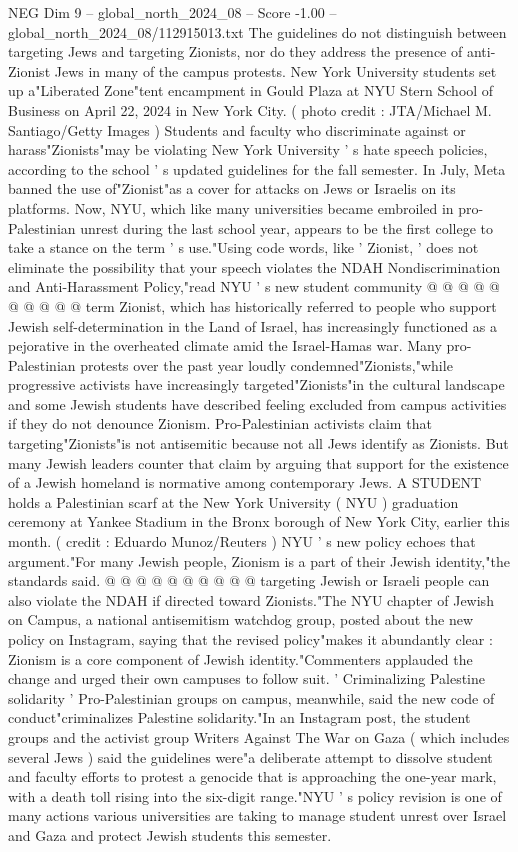\begin{textsample}{NEG Dim 9 – global\_north\_2024\_08 – Score -1.00 – global\_north\_2024\_08/112915013.txt}  \label{ex:f9_neg_263}
The guidelines do not distinguish between targeting Jews and targeting Zionists, nor do they address the presence of anti-Zionist Jews in many of the campus protests.
New York University students set up a"Liberated Zone"tent encampment in Gould Plaza at NYU Stern School of Business on April 22, 2024 in New York City. ( photo credit : JTA/Michael M.
Santiago/Getty Images ) Students and faculty who discriminate against or harass"Zionists"may be violating New York University ' s hate speech policies, according to the school ' s updated guidelines for the fall semester.
In July, Meta banned the use of"Zionist"as a cover for attacks on Jews or Israelis on its platforms.
Now, NYU, which like many universities became embroiled in pro-Palestinian unrest during the last school year, appears to be the first college to take a stance on the term ' s use."Using code words, like ' Zionist, ' does not eliminate the possibility that your speech violates the NDAH Nondiscrimination and Anti-Harassment Policy,"read NYU ' s new student community @ @ @ @ @ @ @ @ @ @ term Zionist, which has historically referred to people who support Jewish self-determination in the Land of Israel, has increasingly functioned as a pejorative in the overheated climate amid the Israel-Hamas war.
Many pro-Palestinian protests over the past year loudly condemned"Zionists,"while progressive activists have increasingly targeted"Zionists"in the cultural landscape and some Jewish students have described feeling excluded from campus activities if they do not denounce Zionism.
Pro-Palestinian activists claim that targeting"Zionists"is not antisemitic because not all Jews identify as Zionists.
But many Jewish leaders counter that claim by arguing that support for the existence of a Jewish homeland is normative among contemporary Jews.
A STUDENT holds a Palestinian scarf at the New York University ( NYU ) graduation ceremony at Yankee Stadium in the Bronx borough of New York City, earlier this month. ( credit : Eduardo Munoz/Reuters ) NYU ' s new policy echoes that argument."For many Jewish people, Zionism is a part of their Jewish identity,"the standards said. @ @ @ @ @ @ @ @ @ @ targeting Jewish or Israeli people can also violate the NDAH if directed toward Zionists."The NYU chapter of Jewish on Campus, a national antisemitism watchdog group, posted about the new policy on Instagram, saying that the revised policy"makes it abundantly clear : Zionism is a core component of Jewish identity."Commenters applauded the change and urged their own campuses to follow suit. ' Criminalizing Palestine solidarity ' Pro-Palestinian groups on campus, meanwhile, said the new code of conduct"criminalizes Palestine solidarity."In an Instagram post, the student groups and the activist group Writers Against The War on Gaza ( which includes several Jews ) said the guidelines were"a deliberate attempt to dissolve student and faculty efforts to protest a genocide that is approaching the one-year mark, with a death toll rising into the six-digit range."NYU ' s policy revision is one of many actions various universities are taking to manage student unrest over Israel and Gaza and protect Jewish students this semester.

\end{textsample}
